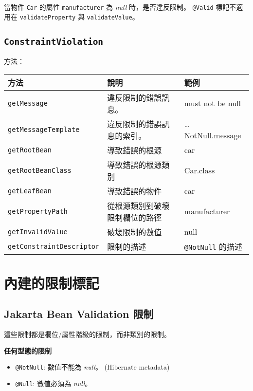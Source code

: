 當物件 \texttt{Car} 的屬性 \texttt{manufacturer} 為 \textit{null} 時，是否違反限制。
\texttt{@Valid} 標記不適用在 \texttt{validateProperty} 與 \texttt{validateValue}。

\subsection{\texttt{ConstraintViolation}}

方法：

\begin{tabular}{|l|l|l|}
\hline
\textbf{方法} & \textbf{說明} & \textbf{範例} \\ \hline
\texttt{getMessage} & 違反限制的錯誤訊息。 & must not be null \\ \hline
\texttt{getMessageTemplate} & 違反限制的錯誤訊息的索引。 & {…​ NotNull.message} \\ \hline
\texttt{getRootBean} & 導致錯誤的根源 & car \\ \hline
\texttt{getRootBeanClass} & 導致錯誤的根源類別 & Car.class \\ \hline
\texttt{getLeafBean} & 導致錯誤的物件 & car\\ \hline
\texttt{getPropertyPath} & 從根源類別到破壞限制欄位的路徑 & manufacturer \\ \hline
\texttt{getInvalidValue} & 破壞限制的數值 & null \\ \hline
\texttt{getConstraintDescriptor} & 限制的描述 & \texttt{@NotNull} 的描述 \\ \hline
\end{tabular}

\section{內建的限制標記}

\subsection{Jakarta Bean Validation 限制}

這些限制都是欄位/屬性階級的限制，而非類別的限制。

\vspace{10pt}

\noindent\textbf{任何型態的限制}

\begin{itemize}
\item \texttt{@NotNull}: 數值不能為 \textit{null}。 (Hibernate metadata)
\item \texttt{@Null}: 數值必須為 \textit{null}。
\end{itemize}

